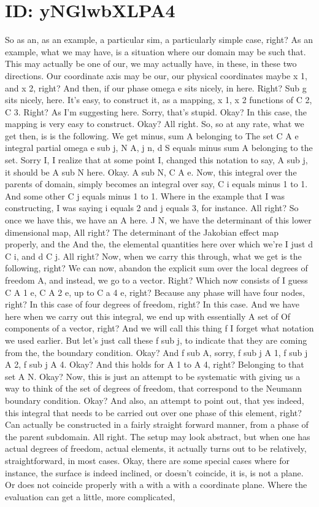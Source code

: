 \documentclass[10pt]{article}
\begin{document}
\section*{ID: yNGlwbXLPA4}
So as an, as an example, a particular sim, a particularly simple case, right? As an example, what we may have, is a situation where our domain may be such that. This may actually be one of our, we may actually have, in these, in these two directions. Our coordinate axis may be our, our physical coordinates maybe x 1, and x 2, right? And then, if our phase omega e sits nicely, in here. Right? Sub g sits nicely, here. It's easy, to construct it, as a mapping, x 1, x 2 functions of C 2, C 3. Right? As I'm suggesting here. Sorry, that's stupid. Okay? In this case, the mapping is very easy to construct. Okay? All right. So, so at any rate, what we get then, is is the following. We get minus, sum A belonging to The set C A e integral partial omega e sub j, N A, j n, d S equals minus sum A belonging to the set. Sorry I, I realize that at some point I, changed this notation to say, A sub j, it should be A sub N here. Okay. A sub N, C A e. Now, this integral over the parents of domain, simply becomes an integral over say, C i equals minus 1 to 1. And some other C j equals minus 1 to 1. Where in the example that I was constructing, I was saying i equals 2 and j equals 3, for instance. All right? So once we have this, we have an A here. J N, we have the determinant of this lower dimensional map, All right? The determinant of the Jakobian effect map properly, and the And the, the elemental quantities here over which we're  I just d C i, and d C j. All right? Now, when we carry this through, what we get is the following, right? We can now, abandon the explicit sum over the local degrees of freedom A, and instead, we go to a vector. Right? Which now consists of I guess C A 1 e, C A 2 e, up to C a 4 e, right? Because any phase will have four nodes, right? In this case of four degrees of freedom, right? In this case. And we have here when we carry out this integral, we end up with essentially A set of Of components of a vector, right? And we will call this thing f I forget what notation we used earlier. But let's just call these f sub j, to indicate that they are coming from the, the boundary condition. Okay? And f sub A, sorry, f sub j A 1, f sub j A 2, f sub j A 4. Okay? And this holds for A 1 to A 4, right? Belonging to that set A N. Okay? Now, this is just an attempt to be systematic with giving us a way to think of the set of degrees of freedom, that correspond to the Neumann boundary condition. Okay? And also, an attempt to point out, that yes indeed, this integral that needs to be carried out over one phase of this element, right? Can actually be constructed in a fairly straight forward manner, from a phase of the parent subdomain. All right. The setup may look abstract, but when one has actual degrees of freedom, actual elements, it actually turns out to be relatively, straightforward, in most cases. Okay, there are some special cases where for instance, the surface is indeed inclined, or doesn't coincide, it is, is not a plane. Or does not coincide properly with a with a with a coordinate plane. Where the evaluation can get a little, more complicated, 
\end{document}

